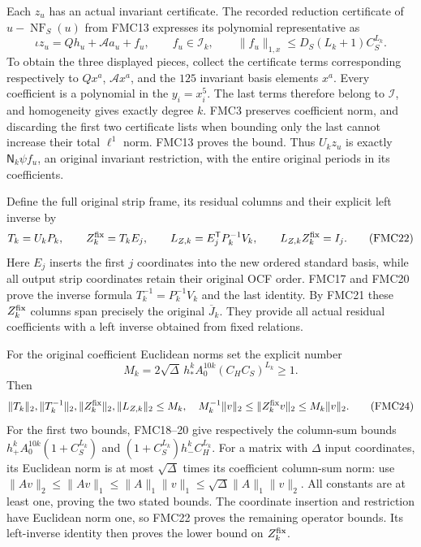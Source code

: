 \documentclass[11pt,a4paper]{article}
\begin{document}
Each $z_u$ has an actual invariant certificate. The recorded reduction
certificate of $u-\operatorname{NF}_S(u)$ from FMC13 expresses its
polynomial representative as
\[
 \iota z_u=Qh_u+\mathcal A a_u+f_u,
 \qquad f_u\in\mathscr I_k,
 \qquad \|f_u\|_{1,x}
                  \le D_S(L_k+1)C_S^{L_k}.
 \tag{FMC21}
\]
To obtain the three displayed pieces, collect the certificate terms
corresponding respectively to $Qx^a$, $\mathcal Ax^a$, and the
$125$ invariant basis elements $x^a$. Every coefficient is a
polynomial in the $y_i=x_i^5$. The last terms therefore belong
to $\mathscr I$, and homogeneity gives exactly degree $k$.
FMC3 preserves coefficient norm, and discarding the first two
certificate lists when bounding only the last cannot increase
their total $\ell^1$ norm. FMC13 proves the bound. Thus $U_kz_u$
is exactly $\mathsf N_k\psi f_u$, an original invariant restriction,
with the entire original periods in its coefficients.

Define the full original strip frame, its residual columns and their
explicit left inverse by
\[
 T_k=U_kP_k,\qquad
 Z_k^{\rm fix}=T_kE_j,\qquad
 L_{Z,k}=E_j^{\mathsf T}P_k^{-1}V_k,\qquad
 L_{Z,k}Z_k^{\rm fix}=I_j.
 \tag{FMC22}
\]
Here $E_j$ inserts the first $j$ coordinates into the new ordered
standard basis, while all output strip coordinates retain their
original OCF order. FMC17 and FMC20 prove the inverse formula
$T_k^{-1}=P_k^{-1}V_k$ and the last identity. By FMC21 these
$Z_k^{\rm fix}$ columns span precisely the original $\overline J_k$.
They provide all actual residual coefficients with a left inverse
obtained from fixed relations.

For the original coefficient Euclidean norms set the explicit number
\[
 M_k=2\sqrt{\Delta}\,h_*^k A_0^{10k}(C_HC_S)^{L_k}\ge1.
 \tag{FMC23}
\]
Then
\[
 \|T_k\|_2,\|T_k^{-1}\|_2,
       \|Z_k^{\rm fix}\|_2,\|L_{Z,k}\|_2\le M_k,
 \quad
 M_k^{-1}\|v\|_2\le\|Z_k^{\rm fix}v\|_2\le M_k\|v\|_2.
 \tag{FMC24}
\]
For the first two bounds, FMC18--20 give respectively the column-sum
bounds $h_+^kA_0^{10k}(1+C_S^{L_k})$ and
$(1+C_S^{L_k})h_-^kC_H^{L_k}$. For a matrix with $\Delta$
input coordinates, its Euclidean norm is at most $\sqrt\Delta$
times its coefficient column-sum norm: use
$\|Av\|_2\le\|Av\|_1\le\|A\|_1\|v\|_1
\le\sqrt\Delta\|A\|_1\|v\|_2$.
All constants are at least one, proving the two stated bounds.
The coordinate insertion and restriction have Euclidean norm one,
so FMC22 proves the remaining operator bounds. Its left-inverse
identity then proves the lower bound on $Z_k^{\rm fix}$.
\end{document}
